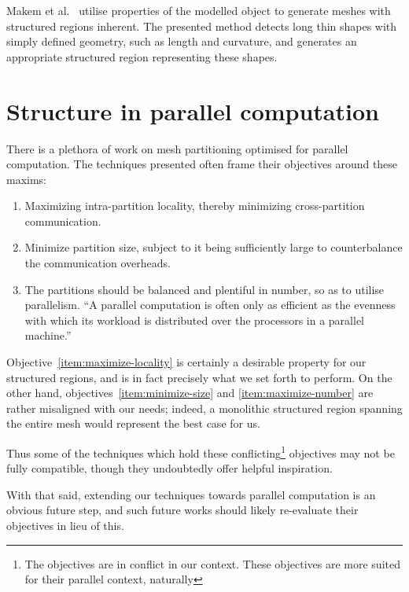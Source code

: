 Makem et al.~\cite{makem2012automatic} utilise properties of the modelled object to generate meshes with structured regions inherent. The presented method detects long thin shapes with simply defined geometry, such as length and curvature, and generates an appropriate structured region representing these shapes.



\section{Structure in parallel computation}
There is a plethora of work on mesh partitioning optimised for parallel computation. The techniques presented often frame their objectives around these maxims:
\begin{enumerate}
\item \label{item:maximize-locality} Maximizing intra-partition locality, thereby minimizing cross-partition communication.
\item \label{item:minimize-size} Minimize partition size, subject to it being sufficiently large to counterbalance the communication overheads.
\item \label{item:maximize-number} The partitions should be balanced and plentiful in number, so as to utilise parallelism.
``A parallel computation is often only as efficient as the evenness with which its workload is distributed over the processors in a parallel machine.''
\end{enumerate}

Objective~\ref{item:maximize-locality} is certainly a desirable property for our structured regions, and is in fact precisely what we set forth to perform.
On the other hand, objectives~\ref{item:minimize-size} and \ref{item:maximize-number} are rather misaligned with our needs; indeed, a monolithic structured region spanning the entire mesh would represent the best case for us.

Thus some of the techniques which hold these conflicting\footnote{The objectives are in conflict in our context. These objectives are more suited for their parallel context, naturally} objectives may not be fully compatible, though they undoubtedly offer helpful inspiration.

With that said, extending our techniques towards parallel computation is an obvious future step, and such future works should likely re-evaluate their objectives in lieu of this.




